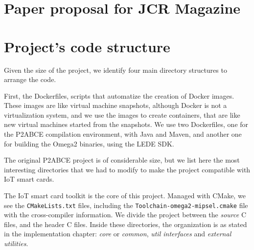 \chapter{Paper proposal for JCR Magazine}\label{ch:JCR}




\chapter{Project's code structure}\label{ch:code}

Given the size of the project, we identify four main directory structures to arrange the code.


First, the Dockerfiles, scripts that automatize the creation of Docker images. These images are like virtual machine snapshots, although Docker is not a virtualization system, and we use the images to create containers, that are like new virtual machines started from the snapshots. We use two Dockerfiles, one for the P2ABCE compilation environment, with Java and Maven, and another one for building the Omega2 binaries, using the LEDE SDK.



\hfil

The original P2ABCE project is of considerable size, but we list here the most interesting directories that we had to modify to make the project compatible with IoT smart cards.

\hfil




\hfil

The IoT smart card toolkit is the core of this project. Managed with CMake, we see the \texttt{CMakeLists.txt} files, including the \texttt{Toolchain-omega2-mipsel.cmake} file with the cross-compiler information. We divide the project between the \textit{source} C files, and the header C files. Inside these directories, the organization is as stated in the implementation chapter: \textit{core} or \textit{common}, \textit{util interfaces} and \textit{external utilities}.

